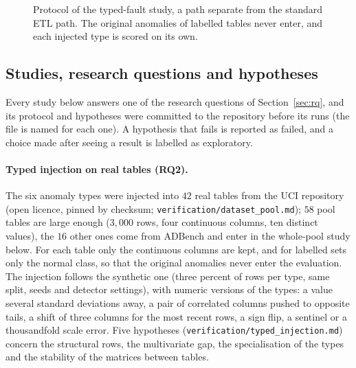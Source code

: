 \documentclass[conference]{IEEEtran}
\begin{document}
\begin{figure}[t]
\centering
{}
\caption{Protocol of the typed-fault study, a path separate from the standard ETL path. The original
anomalies of labelled tables never enter, and each injected type is scored on its own.}
\label{fig:injection}
\end{figure}

\subsection{Studies, research questions and hypotheses}
\label{sec:studies}
Every study below answers one of the research questions of Section~\ref{sec:rq}, and its
protocol and hypotheses were committed to the repository before its runs (the file is named
for each one). A hypothesis that fails is reported as failed, and a choice made after seeing a
result is labelled as exploratory.

\paragraph{Typed injection on real tables (RQ2).} The six anomaly types were injected into
$42$ real tables from the UCI repository (open licence, pinned by checksum;
\texttt{verification/dataset\_pool.md}); $58$ pool tables are large enough ($3{,}000$ rows,
four continuous columns, ten distinct values), the $16$ other ones come from ADBench and enter
in the whole-pool study below. For each table only the continuous columns are kept, and for
labelled sets only the normal class, so that the original anomalies never enter the evaluation.
The injection follows the synthetic one (three percent of rows per type, same split, seeds and
detector settings), with numeric versions of the types: a value several standard deviations
away, a pair of correlated columns pushed to opposite tails, a shift of three columns for the
most recent rows, a sign flip, a sentinel or a thousandfold scale error. Five hypotheses
(\texttt{verification/typed\_injection.md}) concern the structural rows, the multivariate gap,
the specialisation of the types and the stability of the matrices between tables.
\end{document}
